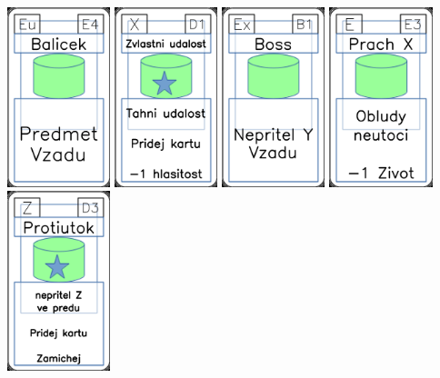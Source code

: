 \documentclass[a4paper]{article}
\begin{document}
	\includegraphics[width=3.0cm]{img-4_23}
	\includegraphics[width=3.0cm]{img-5_15}
	\includegraphics[width=3.0cm]{img-4_5}
	\includegraphics[width=3.0cm]{img-4_52}
	\includegraphics[width=3.0cm]{img-5_47}
\end{document}
